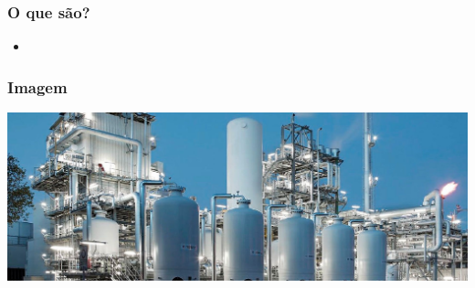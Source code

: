 \documentclass{beamer}
\begin{document}
\begin{frame}
	\frametitle{
		{\textcolor{yellow!70!black}{ {\LARGE {}}} %
			\textcolor{white!100!black}{O que são?}}} %
	\begin{tcolorbox}[colback=red!5!white,colframe=red!70!white,title=Citação]
		\begin{itemize}

			\item \cite{kerry2007industrial}
			


		\end{itemize}
	\end{tcolorbox}
\end{frame}

\begin{frame}
	\frametitle{{\textcolor{yellow!70!black}{ {\LARGE {}}} %
			\textcolor{white!100!black}{Imagem}}} %
		\begin{tcolorbox}[colback=blue!5!white,colframe=purple!30!white,title=Imagem]
			\includegraphics[width=0.5 \paperwidth, height=0.5 \paperheight]{gas}
		\end{tcolorbox}
\end{frame}
\end{document}
